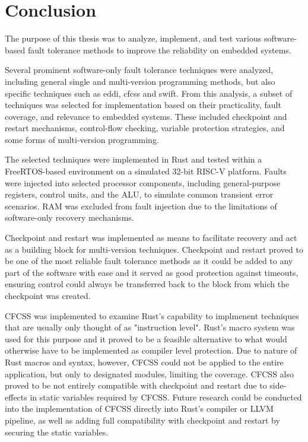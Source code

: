 \documentclass[12pt, letterpaper, slovak]{article}
\begin{document}


\clearpage


\clearpage
\section{Conclusion}

The purpose of this thesis was to analyze, implement, and test various software-based fault tolerance methods to improve the reliability on embedded systems.

Several prominent software-only fault tolerance techniques were analyzed, including general single and multi-version programming methods, but also specific techniques such as \acrshort{eddi}, \acrshort{cfcss} and \acrshort{swift}. From this analysis, a subset of techniques was selected for implementation based on their practicality, fault coverage, and relevance to embedded systems. These included checkpoint and restart mechanisms, control-flow checking, variable protection strategies, and some forms of multi-version programming.

The selected techniques were implemented in Rust and tested within a FreeRTOS-based environment on a simulated 32-bit RISC-V platform. Faults were injected into selected processor components, including general-purpose registers, control units, and the ALU, to simulate common transient error scenarios. RAM was excluded from fault injection due to the limitations of software-only recovery mechanisms.

Checkpoint and restart was implemented as means to facilitate recovery and act as a building block for multi-version techniques. Checkpoint and restart proved to be one of the most reliable fault tolerance methods as it could be added to any part of the software with ease and it served as good protection against timeouts, ensuring control could always be transferred back to the block from which the checkpoint was created.

CFCSS was implemented to examine Rust's capability to implmenent techniques that are usually only thought of as "instruction level". Rust's macro system was used for this purpose and it proved to be a feasible alternative to what would otherwise have to be implemented as compiler level protection. Due to nature of Rust macros and syntax, however, CFCSS could not be applied to the entire application, but only to designated modules, limiting the coverage. CFCSS also proved to be not entirely compatible with checkpoint and restart due to side-effects in static variables required by CFCSS. Future research could be conducted into the implementation of CFCSS directly into Rust's compiler or LLVM pipeline, as well as adding full compatibility with checkpoint and restart by securing the static variables.
\end{document}
